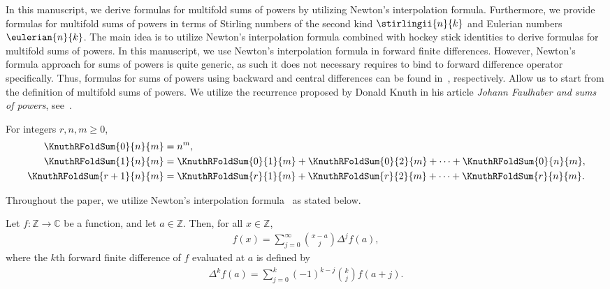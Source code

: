 In this manuscript, we derive formulas for multifold sums of powers
by utilizing Newton's interpolation formula.
Furthermore, we provide formulas for multifold sums of powers in terms
of Stirling numbers of the second kind $\stirlingii{n}{k}$
and Eulerian numbers $\eulerian{n}{k}$.
The main idea is to utilize Newton's interpolation formula
combined with hockey stick identities to
derive formulas for multifold sums of powers.
In this manuscript, we use Newton's interpolation formula
in forward finite differences.
However, Newton's formula approach for sums of powers is quite generic,
as such it does not necessary requires to bind to forward difference operator
specifically. Thus, formulas for sums of powers using backward and central
differences can be found
in~\cite{kolosov_2026_18134757, kolosov_2025_18098442}, respectively.
Allow us to start from the definition of multifold sums of powers.
We utilize the recurrence proposed by Donald Knuth in his article
\textit{Johann Faulhaber and sums of powers}, see~\cite{knuth1993johann}.
\begin{proposition} 
  \label{prop:multifold-sums-of-powers-recurrence}
  For integers $r,n,m \geq 0$,
  \begin{align*}
    \KnuthRFoldSum{0}{n}{m}   &= n^m, \\
    \KnuthRFoldSum{1}{n}{m}   &= \KnuthRFoldSum{0}{1}{m}
    + \KnuthRFoldSum{0}{2}{m} + \cdots + \KnuthRFoldSum{0}{n}{m}, \\
    \KnuthRFoldSum{r+1}{n}{m} &= \KnuthRFoldSum{r}{1}{m}
    + \KnuthRFoldSum{r}{2}{m} + \cdots + \KnuthRFoldSum{r}{n}{m}.
  \end{align*}
\end{proposition}
Throughout the paper, we utilize Newton's interpolation
formula~\cite[Lemma V.]{newton1850newton} as stated below.
\begin{proposition}
  Let $f\colon \mathbb{Z} \to \mathbb{C}$ be a function,
  and let $a \in \mathbb{Z}$.
  Then, for all $x \in \mathbb{Z}$,
  \begin{align*}
    f(x) = \sum_{j=0}^{\infty} \binom{x-a}{j} \Delta^{j} f(a),
  \end{align*}
  where the $k$th forward finite difference of $f$ evaluated at $a$ is defined by
  \begin{align*}
    \Delta^{k} f(a)
    = \sum_{j=0}^{k} (-1)^{k-j} \binom{k}{j} f(a+j).
  \end{align*}
\end{proposition}

